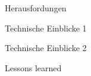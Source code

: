 \begin{frame}{Herausfordungen}
	
\end{frame}

\begin{frame}{Technische Einblicke 1}

\end{frame}

\begin{frame}{Technische Einblicke 2}

\end{frame}

\begin{frame}{Lessons learned}

\end{frame}

%

